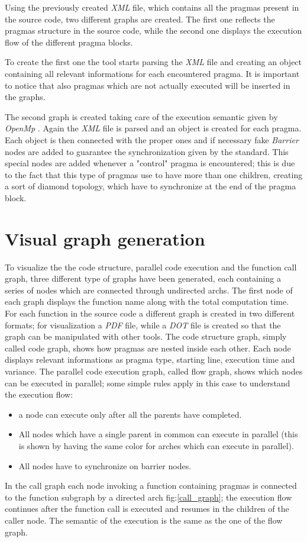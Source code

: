 \documentclass[a4paper,11pt,oneside]{book}
\begin{document}
Using the previously created \emph{XML} file, which contains all the pragmas present in the source code, two different graphs are created. The first one reflects the pragmas structure in the source code, while the second one displays the execution flow of the different pragma blocks. 

To create the first one the tool starts parsing the \emph{XML} file and creating an object containing all relevant informations for each encountered pragma. It is important to notice that also pragmas which are not actually executed will be inserted in the graphs. 

The second graph is created taking care of the execution semantic given by \emph{OpenMp} . Again the \emph{XML} file is parsed and an object is created for each pragma. Each object is then connected with the proper ones and if necessary fake \emph{Barrier} nodes are added to guarantee the synchronization given by the standard. This special nodes are added whenever a "control" pragma is encountered; this is due to the fact that this type of pragmas use to have more than one children, creating a sort of diamond topology, which have to synchronize at the end of the pragma block.





\section{Visual graph generation}

To visualize the the code structure, parallel code execution and the function call graph, three different type of graphs have been generated, each containing a series of nodes which are connected through undirected archs. The first node of each graph displays the function name along with the total computation time. For each function in the source code a different graph is created in two different formats; for visualization a \emph{PDF} file, while a \emph{DOT} file is created so that the graph can be manipulated with other tools. The code structure graph, simply called code graph, shows how pragmas are nested inside each other. Each node displays relevant informations as pragma type, starting line, execution time and variance. The parallel code execution graph, called flow graph, shows which nodes can be executed in parallel; some simple rules apply in this case to understand the execution flow:
\begin{itemize}
\item{a node can execute only after all the parents have completed.}
\item{All nodes which have a single parent in common can execute in parallel (this is shown by having the same color for arches which can execute in parallel).}
\item{All nodes have to synchronize on barrier nodes.}
\end{itemize}
In the call graph each node invoking a function containing pragmas is connected to the function subgraph by a directed arch fig:\ref{call_graph}; the execution flow continues after the function call is executed and resumes in the children of the caller node. The semantic of the execution is the same as the one of the flow graph.
\end{document}
